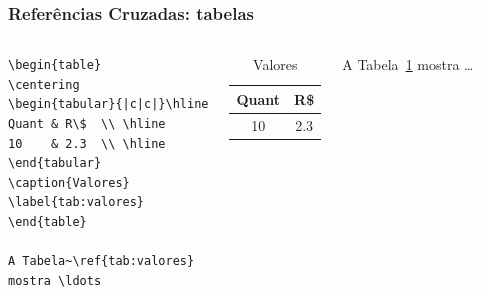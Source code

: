 \begin{frame}[fragile]
\frametitle{Referências Cruzadas: tabelas}
{\scriptsize
\begin{columns}
\begin{verbatim}
\begin{table}
\centering
\begin{tabular}{|c|c|}\hline
Quant & R\$  \\ \hline
10    & 2.3  \\ \hline
\end{tabular}
\caption{Valores}
\label{tab:valores}
\end{table}

A Tabela~\ref{tab:valores} 
mostra \ldots
\end{verbatim}

\begin{table}
\centering
\begin{tabular}{|c|c|}\hline
Quant & R\$  \\ \hline
10    & 2.3  \\ \hline
\end{tabular}
\caption{Valores}
\label{tab:valores}
\end{table}

A Tabela~\ref{tab:valores} mostra \ldots
\end{columns}
 }
\end{frame}


